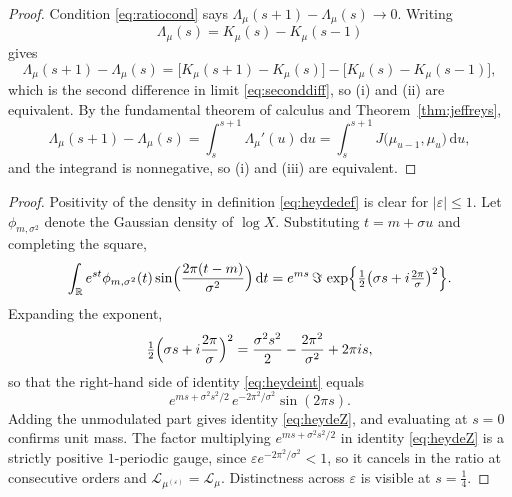 \documentclass[sn-mathphys-num]{sn-jnl}
\theoremstyle{thmstyleone}%
\theoremstyle{thmstyletwo}%
\theoremstyle{thmstylethree}%
\theoremstyle{thmstyleone}%
\providecommand{\R}{\mathbb{R}}
\providecommand{\Leh}{\mathscr{L}}
\providecommand{\dd}{\,\mathrm{d}}
\begin{document}
\begin{appendices}
		\begin{proof}
			Condition \eqref{eq:ratiocond} says
			$\Lambda_\mu(s+1)-\Lambda_\mu(s)\to0$. Writing
			\begin{equation}\label{eq:lamdiff}
				\Lambda_\mu(s)=K_\mu(s)-K_\mu(s-1)
			\end{equation}
			gives
			\begin{equation}\label{eq:diffidentity}
				\Lambda_\mu(s+1)-\Lambda_\mu(s)
				=\bigl[K_\mu(s+1)-K_\mu(s)\bigr]
				-\bigl[K_\mu(s)-K_\mu(s-1)\bigr],
			\end{equation}
			which is the second difference in limit \eqref{eq:seconddiff}, so (i)
			and (ii) are equivalent. By the fundamental theorem of calculus
			and Theorem~\ref{thm:jeffreys},
			\begin{equation}\label{eq:cesaro}
				\Lambda_\mu(s+1)-\Lambda_\mu(s)
				=\int_{s}^{s+1}\Lambda_\mu'(u)\dd u
				=\int_{s}^{s+1}J\bigl(\mu_{u-1},\mu_u\bigr)\dd u ,
			\end{equation}
			and the integrand is nonnegative, so (i) and (iii) are
			equivalent.
		\end{proof}
		
		
		\thmheyde*
		
		\begin{proof}
			Positivity of the density in definition \eqref{eq:heydedef} is clear for
			$|\varepsilon|\le1$. Let $\phi_{m,\sigma^2}$ denote the Gaussian
			density of $\log X$. Substituting $t=m+\sigma u$ and completing
			the square,
			\begin{equation}\label{eq:heydeint}
				\int_\R e^{st}\phi_{m,\sigma^2}(t)
				\sin\Bigl(\frac{2\pi(t-m)}{\sigma^{2}}\Bigr)\dd t
				=e^{ms}\,\Im\,
				\exp\Bigl\{\tfrac12\bigl(\sigma s
				+i\tfrac{2\pi}{\sigma}\bigr)^{2}\Bigr\} .
			\end{equation}
			Expanding the exponent,
			\begin{equation}\label{eq:heydeexpand}
				\tfrac12\Bigl(\sigma s+i\frac{2\pi}{\sigma}\Bigr)^2
				=\frac{\sigma^2s^2}{2}-\frac{2\pi^2}{\sigma^2}+2\pi is ,
			\end{equation}
			so that the right-hand side of identity \eqref{eq:heydeint} equals
			\begin{equation}\label{eq:heydevalue}
				e^{ms+\sigma^2s^2/2}\,e^{-2\pi^2/\sigma^2}\sin(2\pi s).
			\end{equation}
			Adding the unmodulated part gives identity \eqref{eq:heydeZ}, and
			evaluating at $s=0$ confirms unit mass. The factor multiplying
			$e^{ms+\sigma^2s^2/2}$ in identity \eqref{eq:heydeZ} is a strictly positive
			$1$-periodic gauge, since
			$\varepsilon e^{-2\pi^2/\sigma^2}<1$, so it cancels in the ratio
			at consecutive orders and $\Leh_{\mu^{(\varepsilon)}}=\Leh_\mu$.
			Distinctness across $\varepsilon$ is visible at $s=\tfrac14$.
		\end{proof}
		

\end{appendices}
\end{document}
